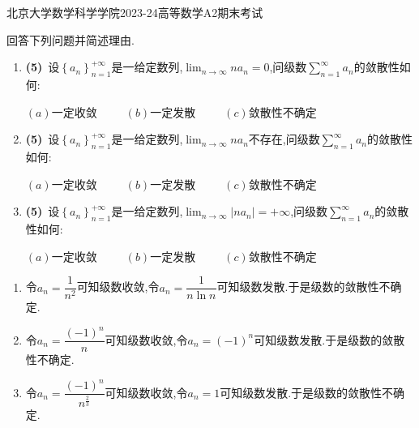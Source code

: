 \documentclass{ctexart}
\begin{document}
\pagestyle{empty}
\begin{center}\Large
    北京大学数学科学学院2023-24高等数学A2期末考试
\end{center}
\begin{problem}[1.(15\songti{分})]
    回答下列问题并简述理由.
    \begin{enumerate}[label=\tbf{(\arabic*)},topsep=0pt,parsep=0pt,itemsep=0pt,partopsep=0pt]
        \item \textbf{(5)}\ 设$\left\{a_n\right\}_{n=1}^{+\infty}$是一给定数列,$\displaystyle\lim_{n\to\infty}na_n=0$,问级数$\displaystyle\sum_{n=1}^{\infty}a_n$的敛散性如何:
            \begin{center}
                $(a)$一定收敛\ \ \ \ \ $(b)$一定发散\ \ \ \ \ $(c)$敛散性不确定
            \end{center}
        \item \textbf{(5)}\ 设$\left\{a_n\right\}_{n=1}^{+\infty}$是一给定数列,$\displaystyle\lim_{n\to\infty}na_n$不存在,问级数$\displaystyle\sum_{n=1}^{\infty}a_n$的敛散性如何:
            \begin{center}
                $(a)$一定收敛\ \ \ \ \ $(b)$一定发散\ \ \ \ \ $(c)$敛散性不确定
            \end{center}
        \item \textbf{(5)}\ 设$\left\{a_n\right\}_{n=1}^{+\infty}$是一给定数列,$\displaystyle\lim_{n\to\infty}\left|na_n\right|=+\infty$,问级数$\displaystyle\sum_{n=1}^{\infty}a_n$的敛散性如何:
            \begin{center}
                $(a)$一定收敛\ \ \ \ \ $(b)$一定发散\ \ \ \ \ $(c)$敛散性不确定
            \end{center}
    \end{enumerate}

\end{problem}
\begin{solution}
    \begin{enumerate}[label=\tbf{(\arabic*)},topsep=0pt,parsep=0pt,itemsep=0pt,partopsep=0pt]
        \item 令$a_n=\dfrac{1}{n^2}$可知级数收敛,令$a_n=\dfrac{1}{n\ln n}$可知级数发散.于是级数的敛散性不确定.
        \item 令$a_n=\dfrac{(-1)^n}{n}$可知级数收敛,令$a_n=(-1)^n$可知级数发散.于是级数的敛散性不确定.
        \item 令$a_n=\dfrac{(-1)^n}{n^{\frac23}}$可知级数收敛,令$a_n=1$可知级数发散.于是级数的敛散性不确定.
    \end{enumerate}
\end{solution}
\end{document}
